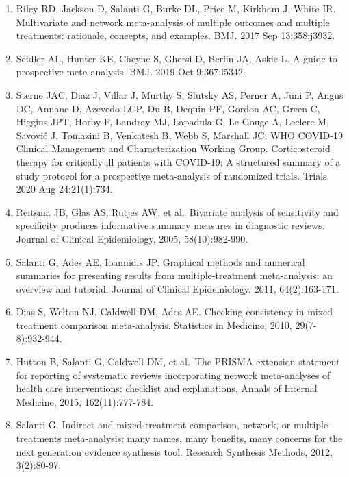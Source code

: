 \documentclass[
  chinese-hans,
  letterpaper,
  DIV=11,
  numbers=noendperiod]{scrreprt}
\begin{document}
\begin{enumerate}
\def\labelenumi{\arabic{enumi}.}
\item
  Riley RD, Jackson D, Salanti G, Burke DL, Price M, Kirkham J, White
  IR. Multivariate and network meta-analysis of multiple outcomes and
  multiple treatments: rationale, concepts, and examples. BMJ. 2017 Sep
  13;358:j3932.
\item
  Seidler AL, Hunter KE, Cheyne S, Ghersi D, Berlin JA, Askie L. A guide
  to prospective meta-analysis. BMJ. 2019 Oct 9;367:l5342.
\item
  Sterne JAC, Diaz J, Villar J, Murthy S, Slutsky AS, Perner A, Jüni P,
  Angus DC, Annane D, Azevedo LCP, Du B, Dequin PF, Gordon AC, Green C,
  Higgins JPT, Horby P, Landray MJ, Lapadula G, Le Gouge A, Leclerc M,
  Savović J, Tomazini B, Venkatesh B, Webb S, Marshall JC; WHO COVID-19
  Clinical Management and Characterization Working Group. Corticosteroid
  therapy for critically ill patients with COVID-19: A structured
  summary of a study protocol for a prospective meta-analysis of
  randomized trials. Trials. 2020 Aug 24;21(1):734.
\item
  Reitsma JB, Glas AS, Rutjes AW, et al.~Bivariate analysis of
  sensitivity and specificity produces informative summary measures in
  diagnostic reviews. Journal of Clinical Epidemiology, 2005,
  58(10):982-990.
\item
  Salanti G, Ades AE, Ioannidis JP. Graphical methods and numerical
  summaries for presenting results from multiple-treatment
  meta-analysis: an overview and tutorial. Journal of Clinical
  Epidemiology, 2011, 64(2):163-171.
\item
  Dias S, Welton NJ, Caldwell DM, Ades AE. Checking consistency in mixed
  treatment comparison meta-analysis. Statistics in Medicine, 2010,
  29(7-8):932-944.
\item
  Hutton B, Salanti G, Caldwell DM, et al.~The PRISMA extension
  statement for reporting of systematic reviews incorporating network
  meta-analyses of health care interventions: checklist and
  explanations. Annals of Internal Medicine, 2015, 162(11):777-784.
\item
  Salanti G. Indirect and mixed-treatment comparison, network, or
  multiple-treatments meta-analysis: many names, many benefits, many
  concerns for the next generation evidence synthesis tool. Research
  Synthesis Methods, 2012, 3(2):80-97.
\end{enumerate}

\end{document}
